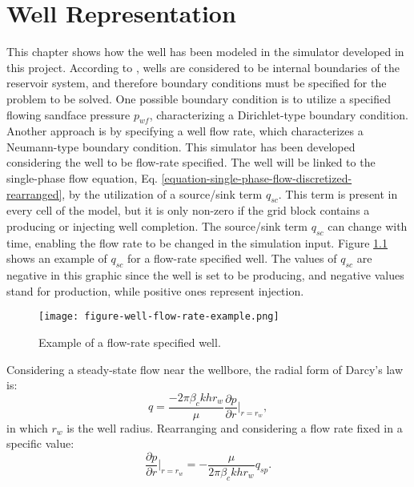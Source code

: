\chapter{Well Representation}
\label{chapter-well-representation}

This chapter shows how the well has been modeled in the simulator developed in this project.
%
According to \cite{Ertekin2001}, wells are considered to be internal boundaries of the reservoir system, and therefore boundary conditions must be specified for the problem to be solved.
%
One possible boundary condition is to utilize a specified flowing sandface pressure $p_{wf}$, characterizing a Dirichlet-type boundary condition.
%
Another approach is by specifying a well flow rate, which characterizes a Neumann-type boundary condition.
%
This simulator has been developed considering the well to be flow-rate specified.
%
The well will be linked to the single-phase flow equation, Eq. \ref{equation-single-phase-flow-discretized-rearranged}, by the utilization of a source/sink term $q_{sc}$.
%
This term is present in every cell of the model, but it is only non-zero if the grid block contains a producing or injecting well completion.
%
The source/sink term $q_{sc}$ can change with time, enabling the flow rate to be changed in the simulation input.
%
Figure \ref{figure-well-flow-rate-example} shows an example of $q_{sc}$ for a flow-rate specified well.
%
The values of $q_{sc}$ are negative in this graphic since the well is set to be producing, and negative values stand for production, while positive ones represent injection.
%
\begin{figure}[h]
	\centering
	\texttt{[image: figure-well-flow-rate-example.png]}\\
	\caption{Example of a flow-rate specified well.}
	\label{figure-well-flow-rate-example}
\end{figure}
%
Considering a steady-state flow near the wellbore, the radial form of Darcy's law is:
%
\begin{equation}
	q=\frac{-2\pi \beta_c k h r_w}{\mu}\frac{\partial p}{\partial r}\Bigg|_{r=r_w},
\end{equation}
%
in which $r_w$ is the well radius.
%
Rearranging and considering a flow rate fixed in a specific value:
%
%
\begin{equation}
	\frac{\partial p}{\partial r}\Bigg|_{r=r_w}=-\frac{\mu}{2\pi\beta_c khr_w}q_{sp}.
\end{equation}
